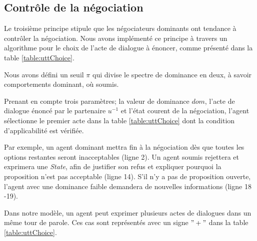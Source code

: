 	\subsection{Contrôle de la négociation}
	
	Le troisième principe stipule que les négociateurs dominants ont tendance à contrôler la négociation.
	Nous avons implémenté ce principe à travers un algorithme pour le choix de l'acte de dialogue à énoncer, comme présenté dans la table \ref{table:uttChoice}.
	
	Nous avons défini un seuil $\pi$  qui divise le spectre de dominance en deux, à savoir comportements dominant, où soumis.
	
	Prenant en compte trois paramètres; la valeur de dominance $dom$, l'acte de dialogue énoncé par le partenaire $u^{-1}$ et l'état courent de la négociation, l'agent sélectionne le premier acte dans la table \ref{table:uttChoice} dont la condition d'applicabilité est vérifiée.  
	
	
	Par exemple, un agent dominant mettra fin à la négociation dès que toutes les options restantes seront inacceptables (ligne 2). Un agent soumis rejettera et exprimera une \emph{State}, afin de justifier son refus et expliquer pourquoi la proposition n'est pas acceptable (ligne 14). S'il n'y a pas de proposition ouverte, l'agent avec une dominance faible demandera de nouvelles informations (ligne 18 -19).
	
	Dans notre modèle, un agent peut exprimer plusieurs actes de dialogues dans un même tour de parole. Ces cas sont représentés avec un signe $"+"$ dans la table \ref{table:uttChoice}.
	
